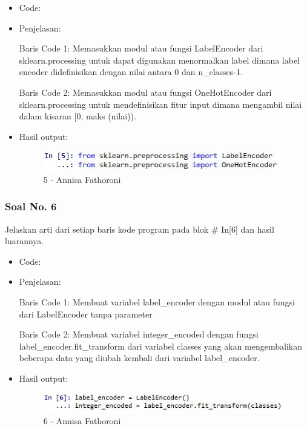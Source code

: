 \begin{itemize}
\item Code:


\item Penjelasan:

Baris Code 1: Memasukkan modul atau fungsi LabelEncoder dari sklearn.processing untuk dapat digunakan menormalkan label dimana label encoder didefinisikan dengan nilai antara 0 dan n\_classes-1.

Baris Code 2: Memasukkan modul atau fungsi OneHotEncoder dari sklearn.processing untuk mendefinisikan fitur input dimana mengambil nilai dalam kisaran [0, maks (nilai)).

\item Hasil output:

\begin{figure}[!hbtp]
\centering
\includegraphics[scale=0.7]{figures/Chapter 7/1164067/Praktek/Chapter7AnnisaFathoroni5.jpg}
\caption{5 - Annisa Fathoroni}
\label{5 - Annisa Fathoroni}
\end{figure}

\end{itemize}

\subsubsection{Soal No. 6}
Jelaskan arti dari setiap baris kode program pada blok \# In[6] dan hasil luarannya.

\begin{itemize}
\item Code:


\item Penjelasan:

Baris Code 1: Membuat variabel label\_encoder dengan modul atau fungsi dari LabelEncoder tanpa parameter

Baris Code 2: Membuat variabel integer\_encoded dengan fungsi label\_encoder.fit\_transform dari variabel classes yang akan mengembalikan beberapa data yang diubah kembali dari variabel label\_encoder.

\item Hasil output:

\begin{figure}[!hbtp]
\centering
\includegraphics[scale=0.7]{figures/Chapter 7/1164067/Praktek/Chapter7AnnisaFathoroni6.jpg}
\caption{6 - Annisa Fathoroni}
\label{6 - Annisa Fathoroni}
\end{figure}

\end{itemize}

